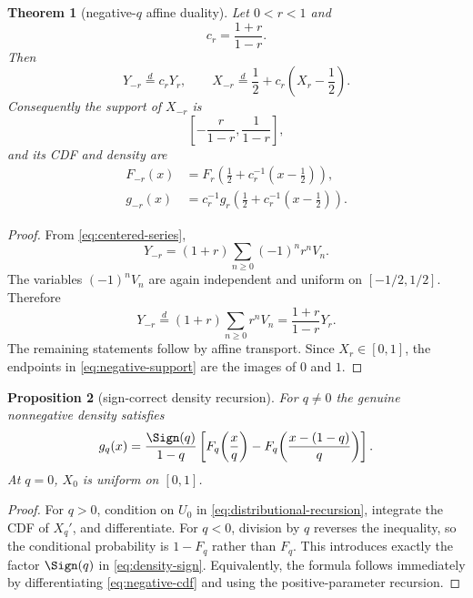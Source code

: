 \documentclass[11pt,oneside]{article}
\newtheorem{theorem}{Theorem}[section]
\newtheorem{proposition}[theorem]{Proposition}
\theoremstyle{definition}
\theoremstyle{remark}
\begin{document}
\begin{theorem}[negative-$q$ affine duality]\label{thm:negative-duality}
Let $0<r<1$ and
\[
 c_r=\frac{1+r}{1-r}.
\]
Then
\begin{equation}\label{eq:negative-duality}
 Y_{-r}\overset d=c_rY_r,
 \qquad
 X_{-r}\overset d=\frac12+c_r\left(X_r-\frac12\right).
\end{equation}
Consequently the support of $X_{-r}$ is
\begin{equation}\label{eq:negative-support}
 \left[-\frac{r}{1-r},\frac{1}{1-r}\right],
\end{equation}
and its CDF and density are
\begin{align}
 F_{-r}(x)&=F_r\!\left(\frac12+c_r^{-1}\left(x-\frac12\right)\right),\label{eq:negative-cdf}\\
 g_{-r}(x)&=c_r^{-1}g_r\!\left(\frac12+c_r^{-1}\left(x-\frac12\right)\right).
 \label{eq:negative-density}
\end{align}
\end{theorem}

\begin{proof}
From \cref{eq:centered-series},
\[
 Y_{-r}=(1+r)\sum_{n\ge0}(-1)^nr^nV_n.
\]
The variables $(-1)^nV_n$ are again independent and uniform on $[-1/2,1/2]$.  Therefore
\[
 Y_{-r}\overset d=(1+r)\sum_{n\ge0}r^nV_n
 =\frac{1+r}{1-r}Y_r.
\]
The remaining statements follow by affine transport.  Since $X_r\in[0,1]$, the endpoints in \cref{eq:negative-support} are the images of $0$ and $1$.
\end{proof}

\begin{proposition}[sign-correct density recursion]\label{prop:density-sign}
For $q\ne0$ the genuine nonnegative density satisfies
\begin{equation}\label{eq:density-sign}
 g_q(x)=\frac{\Sign(q)}{1-q}
 \left[
 F_q\!\left(\frac{x}{q}\right)
 -F_q\!\left(\frac{x-(1-q)}{q}\right)
 \right].
\end{equation}
At $q=0$, $X_0$ is uniform on $[0,1]$.
\end{proposition}

\begin{proof}
For $q>0$, condition on $U_0$ in \cref{eq:distributional-recursion}, integrate the CDF of $X_q'$, and differentiate.  For $q<0$, division by $q$ reverses the inequality, so the conditional probability is $1-F_q$ rather than $F_q$.  This introduces exactly the factor $\Sign(q)$ in \cref{eq:density-sign}.  Equivalently, the formula follows immediately by differentiating \cref{eq:negative-cdf} and using the positive-parameter recursion.
\end{proof}
\end{document}
